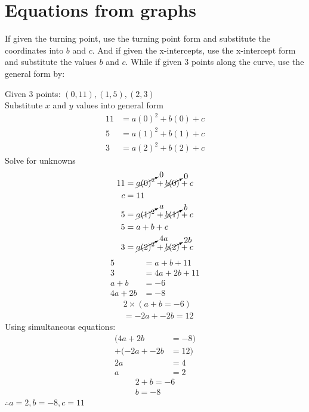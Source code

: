 \documentclass{book}
\begin{document}
\section{Equations from graphs}
If given the turning point, use the turning point form and substitute the coordinates into $b$ and $c$.  And if given the x-intercepts, use the x-intercept form and substitute the values $b$ and $c$.  While if given 3 points along the curve, use the general form by:\\
\begin{center}
	Given 3 points: $(0, 11), (1, 5), (2, 3)$\\
	Substitute $x$ and $y$ values into general form
	\begin{align*}
		11 & = a(0)^2 + b(0) + c \\
		5  & = a(1)^2 + b(1) + c \\
		3  & = a(2)^2 + b(2) + c
	\end{align*}
	Solve for unknowns
	\begin{align*}
		11 & = \cancelto{0}{a(0)^2} + \cancelto{0}{b(0)} + c   \\
		c  & = 11                                              \\
		5  & = \cancelto{a}{a(1)^2} + \cancelto{b}{b(1)} + c   \\
		5  & = a + b + c                                       \\
		3  & = \cancelto{4a}{a(2)^2} + \cancelto{2b}{b(2)} + c \\
	\end{align*}
	\begin{align*}
		5       & = a + b + 11   \\
		3       & = 4a + 2b + 11 \\
		a + b   & = -6           \\
		4a + 2b & = -8
	\end{align*}
	\begin{align*}
		 & 2 \times (a + b = -6) \\
		 & = -2a + -2b = 12
	\end{align*}
	Using simultaneous equations:
	\begin{align*}
		(4a + 2b     & = -8) \\
		+ (-2a + -2b & = 12) \\
		2a           & = 4   \\
		a            & = 2
	\end{align*}
	\begin{align*}
		2 + b = -6 \\
		b = -8
	\end{align*}
	$\therefore a = 2, b = -8, c = 11$
\end{center}
\end{document}
